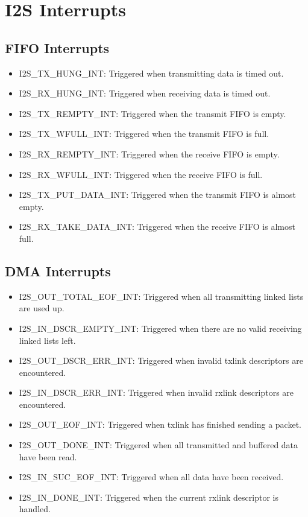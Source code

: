 \documentclass[main\_\_EN.tex]{subfiles}
\begin{document}
\section{I2S Interrupts}
\subsection{FIFO Interrupts}
\begin{itemize}
\item \label{int:I2STXHUNGINT}I2S\_TX\_HUNG\_INT: Triggered when transmitting data is timed out.
\item \label{int:I2SRXHUNGINT}I2S\_RX\_HUNG\_INT: Triggered when receiving data is timed out.
\item \label{int:I2STXREMPTYINT}I2S\_TX\_REMPTY\_INT: Triggered when the transmit FIFO is empty.
\item \label{int:I2STXWFULLINT}I2S\_TX\_WFULL\_INT: Triggered when the transmit FIFO is full.
\item \label{int:I2SRXREMPTYINT}I2S\_RX\_REMPTY\_INT: Triggered when the receive FIFO is empty.
\item \label{int:I2SRXWFULLINT}I2S\_RX\_WFULL\_INT: Triggered when the receive FIFO is full.
\item \label{int:I2STXPUTDATAINT}I2S\_TX\_PUT\_DATA\_INT: Triggered when the transmit FIFO is almost empty.
\item \label{int:I2SRXTAKEDATAINT}I2S\_RX\_TAKE\_DATA\_INT: Triggered when the receive FIFO is almost full.
\end{itemize}

\subsection{DMA Interrupts}\label{DMA Interrupts}

\begin{itemize}
\item \label{int:I2SOUTTOTALEOFINT}I2S\_OUT\_TOTAL\_EOF\_INT: Triggered when all transmitting linked lists are used up.
\item \label{int:I2SINDSCREMPTYINT}I2S\_IN\_DSCR\_EMPTY\_INT: Triggered when there are no valid receiving linked lists left.
\item \label{int:I2SOUTDSCRERRINT}I2S\_OUT\_DSCR\_ERR\_INT: Triggered when invalid txlink descriptors are encountered.
\item \label{int:I2SINDSCRERRINT}I2S\_IN\_DSCR\_ERR\_INT: Triggered when invalid rxlink descriptors are encountered.
\item \label{int:I2SOUTEOFINT}I2S\_OUT\_EOF\_INT: Triggered when txlink has finished sending a packet.
\item \label{int:I2SOUTDONEINT}I2S\_OUT\_DONE\_INT: Triggered when all transmitted and buffered data have been read.
\item \label{int:I2SINSUCEOFINT}I2S\_IN\_SUC\_EOF\_INT: Triggered when all data have been received.
\item \label{int:I2SINDONEINT}I2S\_IN\_DONE\_INT: Triggered when the current rxlink descriptor is handled.
\end{itemize}
\end{document}
